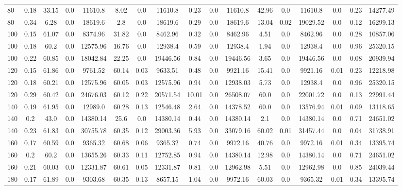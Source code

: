 \begin{sidewaystable}[!h]
{\begin{tabular}{lcccccccccccccccc}
80 & 0.18 & 33.15 & 0.0 & 11610.8 & 8.02 & 0.0 & 11610.8 & 0.23 & 0.0 & 11610.8 & 42.96 & 0.0 & 11610.8 & 0.0 & 0.23 & 14277.49 \\
80 & 0.34 & 6.28 & 0.0 & 18619.6 & 2.8 & 0.0 & 18619.6 & 0.29 & 0.0 & 18619.6 & 13.04 & 0.02 & 19029.52 & 0.0 & 0.12 & 16299.13 \\
100 & 0.15 & 61.07 & 0.0 & 8374.96 & 31.82 & 0.0 & 8462.96 & 0.32 & 0.0 & 8462.96 & 4.51 & 0.0 & 8462.96 & 0.0 & 0.28 & 10857.06 \\
100 & 0.18 & 60.2 & 0.0 & 12575.96 & 16.76 & 0.0 & 12938.4 & 0.59 & 0.0 & 12938.4 & 1.94 & 0.0 & 12938.4 & 0.0 & 0.96 & 25320.15 \\
100 & 0.22 & 60.85 & 0.0 & 18042.84 & 22.25 & 0.0 & 19446.56 & 0.84 & 0.0 & 19446.56 & 3.65 & 0.0 & 19446.56 & 0.0 & 0.08 & 20939.94 \\
120 & 0.15 & 61.86 & 0.0 & 9761.52 & 60.14 & 0.03 & 9633.51 & 0.48 & 0.0 & 9921.16 & 15.41 & 0.0 & 9921.16 & 0.01 & 0.23 & 12218.98 \\
120 & 0.18 & 60.21 & 0.0 & 12575.96 & 60.05 & 0.03 & 12575.96 & 0.94 & 0.0 & 12938.03 & 5.73 & 0.0 & 12938.4 & 0.0 & 0.96 & 25320.15 \\
120 & 0.29 & 60.42 & 0.0 & 24676.03 & 60.12 & 0.22 & 20571.54 & 10.01 & 0.0 & 26508.07 & 60.0 & 0.0 & 22001.72 & 0.0 & 0.13 & 22991.44 \\
140 & 0.19 & 61.95 & 0.0 & 12989.0 & 60.28 & 0.13 & 12546.48 & 2.64 & 0.0 & 14378.52 & 60.0 & 0.0 & 13576.94 & 0.01 & 0.09 & 13118.65 \\
140 & 0.2 & 43.0 & 0.0 & 14380.14 & 25.6 & 0.0 & 14380.14 & 0.44 & 0.0 & 14380.14 & 2.1 & 0.0 & 14380.14 & 0.0 & 0.71 & 24651.02 \\
140 & 0.23 & 61.83 & 0.0 & 30755.78 & 60.35 & 0.12 & 29003.36 & 5.93 & 0.0 & 33079.16 & 60.02 & 0.01 & 31457.44 & 0.0 & 0.04 & 31738.91 \\
160 & 0.17 & 60.59 & 0.0 & 9365.32 & 60.68 & 0.06 & 9365.32 & 0.74 & 0.0 & 9972.16 & 40.76 & 0.0 & 9972.16 & 0.01 & 0.34 & 13395.74 \\
160 & 0.2 & 60.2 & 0.0 & 13655.26 & 60.33 & 0.11 & 12752.85 & 0.94 & 0.0 & 14380.14 & 12.98 & 0.0 & 14380.14 & 0.0 & 0.71 & 24651.02 \\
160 & 0.21 & 60.03 & 0.0 & 12331.87 & 60.61 & 0.05 & 12331.87 & 0.81 & 0.0 & 12962.98 & 5.51 & 0.0 & 12962.98 & 0.0 & 0.85 & 24039.44 \\
180 & 0.17 & 61.89 & 0.0 & 9303.68 & 60.35 & 0.13 & 8657.15 & 1.04 & 0.0 & 9972.16 & 60.03 & 0.0 & 9365.32 & 0.01 & 0.34 & 13395.74 \\

\end{tabular}}
\end{sidewaystable}
